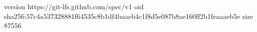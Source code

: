 version https://git-lfs.github.com/spec/v1
oid sha256:57c4a537328881f64535c8b1df4baaeb4c1f8d5e087b8ae160ff2b1feaaaeb5e
size 87556
